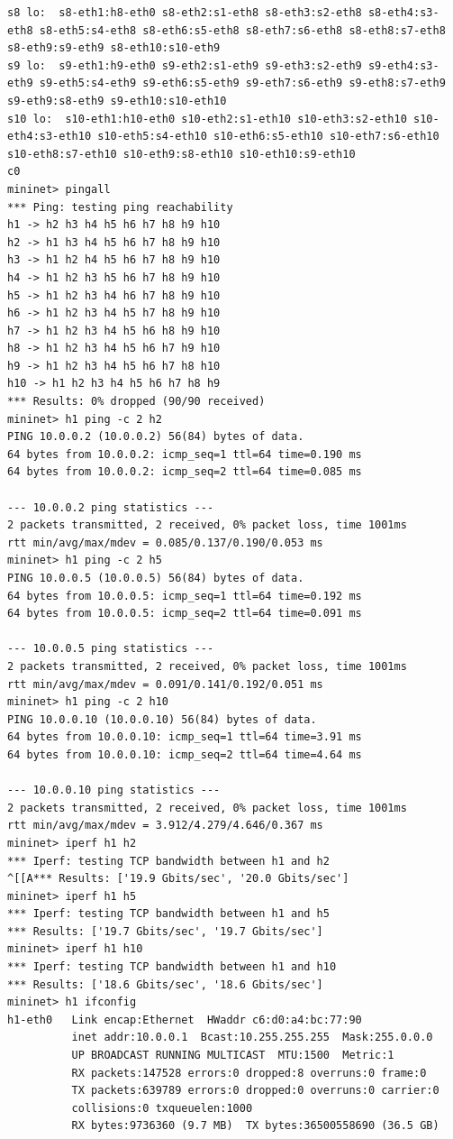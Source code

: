 \documentclass[a4paper, 11pt]{article}
\begin{document}
\begin{appendices}
\begin{lstlisting}[style=BashInputStyle]
s8 lo:  s8-eth1:h8-eth0 s8-eth2:s1-eth8 s8-eth3:s2-eth8 s8-eth4:s3-eth8 s8-eth5:s4-eth8 s8-eth6:s5-eth8 s8-eth7:s6-eth8 s8-eth8:s7-eth8 s8-eth9:s9-eth9 s8-eth10:s10-eth9
s9 lo:  s9-eth1:h9-eth0 s9-eth2:s1-eth9 s9-eth3:s2-eth9 s9-eth4:s3-eth9 s9-eth5:s4-eth9 s9-eth6:s5-eth9 s9-eth7:s6-eth9 s9-eth8:s7-eth9 s9-eth9:s8-eth9 s9-eth10:s10-eth10
s10 lo:  s10-eth1:h10-eth0 s10-eth2:s1-eth10 s10-eth3:s2-eth10 s10-eth4:s3-eth10 s10-eth5:s4-eth10 s10-eth6:s5-eth10 s10-eth7:s6-eth10 s10-eth8:s7-eth10 s10-eth9:s8-eth10 s10-eth10:s9-eth10
c0
mininet> pingall
*** Ping: testing ping reachability
h1 -> h2 h3 h4 h5 h6 h7 h8 h9 h10
h2 -> h1 h3 h4 h5 h6 h7 h8 h9 h10
h3 -> h1 h2 h4 h5 h6 h7 h8 h9 h10
h4 -> h1 h2 h3 h5 h6 h7 h8 h9 h10
h5 -> h1 h2 h3 h4 h6 h7 h8 h9 h10
h6 -> h1 h2 h3 h4 h5 h7 h8 h9 h10
h7 -> h1 h2 h3 h4 h5 h6 h8 h9 h10
h8 -> h1 h2 h3 h4 h5 h6 h7 h9 h10
h9 -> h1 h2 h3 h4 h5 h6 h7 h8 h10
h10 -> h1 h2 h3 h4 h5 h6 h7 h8 h9
*** Results: 0% dropped (90/90 received)
mininet> h1 ping -c 2 h2
PING 10.0.0.2 (10.0.0.2) 56(84) bytes of data.
64 bytes from 10.0.0.2: icmp_seq=1 ttl=64 time=0.190 ms
64 bytes from 10.0.0.2: icmp_seq=2 ttl=64 time=0.085 ms

--- 10.0.0.2 ping statistics ---
2 packets transmitted, 2 received, 0% packet loss, time 1001ms
rtt min/avg/max/mdev = 0.085/0.137/0.190/0.053 ms
mininet> h1 ping -c 2 h5
PING 10.0.0.5 (10.0.0.5) 56(84) bytes of data.
64 bytes from 10.0.0.5: icmp_seq=1 ttl=64 time=0.192 ms
64 bytes from 10.0.0.5: icmp_seq=2 ttl=64 time=0.091 ms

--- 10.0.0.5 ping statistics ---
2 packets transmitted, 2 received, 0% packet loss, time 1001ms
rtt min/avg/max/mdev = 0.091/0.141/0.192/0.051 ms
mininet> h1 ping -c 2 h10
PING 10.0.0.10 (10.0.0.10) 56(84) bytes of data.
64 bytes from 10.0.0.10: icmp_seq=1 ttl=64 time=3.91 ms
64 bytes from 10.0.0.10: icmp_seq=2 ttl=64 time=4.64 ms

--- 10.0.0.10 ping statistics ---
2 packets transmitted, 2 received, 0% packet loss, time 1001ms
rtt min/avg/max/mdev = 3.912/4.279/4.646/0.367 ms
mininet> iperf h1 h2
*** Iperf: testing TCP bandwidth between h1 and h2
^[[A*** Results: ['19.9 Gbits/sec', '20.0 Gbits/sec']
mininet> iperf h1 h5
*** Iperf: testing TCP bandwidth between h1 and h5
*** Results: ['19.7 Gbits/sec', '19.7 Gbits/sec']
mininet> iperf h1 h10
*** Iperf: testing TCP bandwidth between h1 and h10
*** Results: ['18.6 Gbits/sec', '18.6 Gbits/sec']
mininet> h1 ifconfig
h1-eth0   Link encap:Ethernet  HWaddr c6:d0:a4:bc:77:90
          inet addr:10.0.0.1  Bcast:10.255.255.255  Mask:255.0.0.0
          UP BROADCAST RUNNING MULTICAST  MTU:1500  Metric:1
          RX packets:147528 errors:0 dropped:8 overruns:0 frame:0
          TX packets:639789 errors:0 dropped:0 overruns:0 carrier:0
          collisions:0 txqueuelen:1000
          RX bytes:9736360 (9.7 MB)  TX bytes:36500558690 (36.5 GB)


\end{lstlisting}
\end{appendices}
\end{document}
